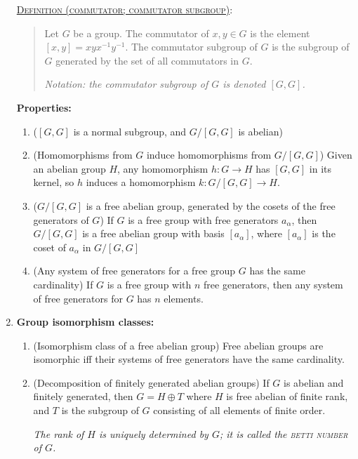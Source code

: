 \documentclass[letterpaper, 12pt]{book}
\newcommand{\defn}[2]{\textsc{\underline{Definition (#1)}:}\begin{quote} #2\end{quote}}
\begin{document}
\begin{enumerate}[resume]
        \defn{commutator; commutator subgroup}{Let $G$ be a group. The commutator of $x,y\in G$ is the element $[x,y] = xyx^{-1}y^{-1}$. The commutator subgroup of $G$ is the subgroup of $G$ generated by the set of all commutators in $G$.

        \textit{Notation: the commutator subgroup of $G$ is denoted $[G,G]$.}}

        \textbf{Properties:}
            \begin{enumerate}
            \item ($[G,G]$ is a normal subgroup, and $G/[G,G]$ is abelian)
            \item (Homomorphisms from $G$ induce homomorphisms from $G/[G,G]$) Given an abelian group $H$, any homomorphism $h:G\to H$ has $[G,G]$ in its kernel, so $h$ induces a homomorphism $k:G/[G,G] \to H$.
            \item ($G/[G,G]$ is a free abelian group, generated by the cosets of the free generators of $G$) If $G$ is a free group with free generators $a_\alpha$, then $G/[G,G]$ is a free abelian group with basis $[a_\alpha]$, where $[a_\alpha]$ is the coset of $a_\alpha$ in $G/[G,G]$
            \item (Any system of free generators for a free group $G$ has the same cardinality) If $G$ is a free group with $n$ free generators, then any system of free generators for $G$ has $n$ elements.
            \end{enumerate}
    \item \textbf{Group isomorphism classes:}
        \begin{enumerate}
        \item (Isomorphism class of a free abelian group) Free abelian groups are isomorphic iff their systems of free generators have the same cardinality.
        \item (Decomposition of finitely generated abelian groups) If $G$ is abelian and finitely generated, then $G = H\oplus T$ where $H$ is free abelian of finite rank, and $T$ is the subgroup of $G$ consisting of all elements of finite order.

        \textit{The rank of $H$ is uniquely determined by $G$; it is called the \textsc{betti number} of $G$.}


\end{enumerate}
\end{enumerate}
\end{document}

